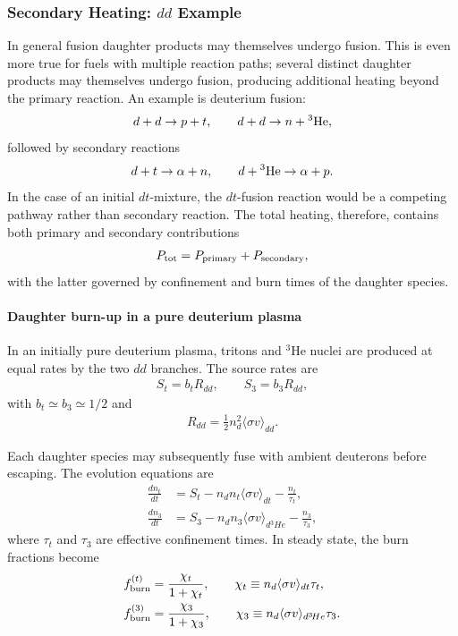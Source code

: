 \documentclass[particles,article,accept,pdftex,moreauthors]{Definitions/mdpi}
\begin{document}
\subsubsection{Secondary Heating: \texorpdfstring{$dd$}{dd} Example}\label{ssubsec:SecondHeating}
In general fusion daughter products may themselves undergo fusion. This is even more true for fuels with multiple reaction paths; several distinct daughter products may themselves undergo fusion, producing additional heating beyond the primary reaction. An example is deuterium fusion:
\begin{align}
 d + d \to p + t,\qquad
 d + d \to n + {}^3{\rm He},
\end{align}
followed by secondary reactions
\begin{align}
 d + t \to \alpha + n,\qquad
d + {}^3{\rm He} \to \alpha + p .
\end{align}
In the case of an initial $dt$-mixture, the $dt$-fusion reaction would be a competing pathway rather than secondary reaction. The total heating, therefore, contains both primary and secondary contributions
\begin{align}
P_{\rm tot}
= P_{\rm primary}
+ P_{\rm secondary},
\end{align}
with the latter governed by confinement and burn times of the daughter species.

\paragraph*{\bf Daughter burn-up in a pure deuterium plasma}
In an initially pure deuterium plasma, tritons and ${}^3\mathrm{He}$ nuclei are produced at equal rates by the two $dd$ branches. 
The source rates are
\begin{align}
S_t = b_t R_{dd},\qquad
S_3 = b_3 R_{dd},
\end{align}
with $b_t \simeq b_3 \simeq 1/2$ and
\begin{align}
R_{dd} = \frac12 n_d^2\langle\sigma v\rangle_{dd}.
\end{align}

Each daughter species may subsequently fuse with ambient deuterons before escaping. The evolution equations are~\cite{harms2000principles,morse2018nuclear}
\begin{align}
\frac{dn_t}{dt}
&= S_t
- n_d n_t \langle\sigma v\rangle_{dt}
- \frac{n_t}{\tau_t}, \\
\frac{dn_3}{dt}
&= S_3
- n_d n_3 \langle\sigma v\rangle_{d{}^3\!He}
- \frac{n_3}{\tau_3},
\end{align}
where $\tau_t$ and $\tau_3$ are effective confinement times. In steady state, the burn fractions become
\begin{align}
f_{\rm burn}^{(t)} &= \frac{\chi_t}{1+\chi_t},
\qquad
\chi_t \equiv n_d\langle\sigma v\rangle_{dt}\tau_t, \\
f_{\rm burn}^{(3)} &= \frac{\chi_3}{1+\chi_3},
\qquad
\chi_3 \equiv n_d\langle\sigma v\rangle_{d{}^3\!He}\tau_3.
\end{align}
\end{document}
